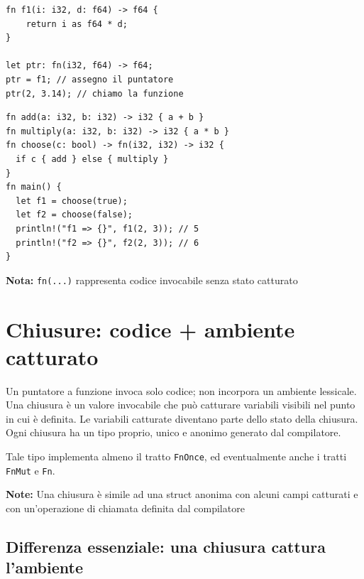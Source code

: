 \begin{center}
  \begin{minipage}{0.45\linewidth}
    \begin{verbatim}
fn f1(i: i32, d: f64) -> f64 { 
    return i as f64 * d; 
}

let ptr: fn(i32, f64) -> f64; 
ptr = f1; // assegno il puntatore 
ptr(2, 3.14); // chiamo la funzione 
\end{verbatim}
  \end{minipage}%
  \hfill
  \begin{minipage}{0.5\linewidth}
    \begin{verbatim}
fn add(a: i32, b: i32) -> i32 { a + b }
fn multiply(a: i32, b: i32) -> i32 { a * b }
fn choose(c: bool) -> fn(i32, i32) -> i32 {
  if c { add } else { multiply }
}
fn main() {
  let f1 = choose(true);
  let f2 = choose(false);
  println!("f1 => {}", f1(2, 3)); // 5
  println!("f2 => {}", f2(2, 3)); // 6
}
\end{verbatim}
  \end{minipage}
\end{center}


\begin{tcolorbox}
  \textbf{Nota:} \verb|fn(...)| rappresenta codice invocabile senza stato catturato
\end{tcolorbox}

\section{Chiusure: codice + ambiente catturato}
Un puntatore a funzione invoca solo codice; non incorpora un ambiente lessicale.
Una chiusura è un valore invocabile che può catturare variabili visibili nel
punto in cui è definita.
Le variabili catturate diventano parte dello stato della chiusura.
Ogni chiusura ha un tipo proprio, unico e anonimo generato dal compilatore.

Tale tipo implementa almeno il tratto \verb|FnOnce|, ed eventualmente anche
i tratti \verb|FnMut| e \verb|Fn|.


\begin{tcolorbox}
  \textbf{Note:} Una chiusura è simile ad una struct anonima con alcuni campi catturati
  e con un'operazione di chiamata definita dal compilatore
\end{tcolorbox}

\subsection{Differenza essenziale: una chiusura cattura l'ambiente}

